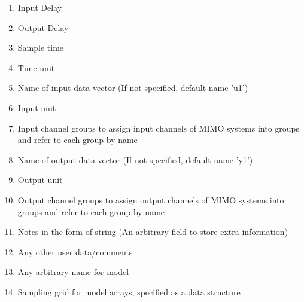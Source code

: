 \documentclass[a4paper,12pt]{report}
\begin{document}
\begin{enumerate}
\begin{enumerate}
				
				
				
				
				
				
			\end{enumerate}
		
		
		
		
		
		
		
		
		
		
		
		
		
	
		\item Input Delay 
	\item Output Delay
	\item Sample time
	\item Time unit
	\item Name of input data vector (If not specified, default name 'u1')
	\item Input unit
	\item Input channel groups to assign input channels of MIMO systems into groups and refer to each group by name
	\item Name of output data vector (If not specified, default name 'y1')
	\item Output unit
	\item Output channel groups to assign output channels of MIMO systems into groups and refer to each group by name
			
	\item Notes in the form of string (An arbitrary field to store extra information)
	
	\item Any other user data/comments
	
	\item Any arbitrary name for model 
	\item Sampling grid for model arrays, specified as a data structure
		
		
		
	
		
		
			
	\end{enumerate}
			
			
			
\end{document}
